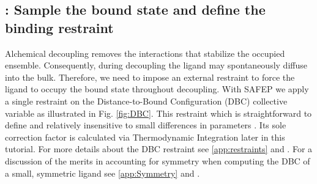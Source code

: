 \documentclass[9pt,tutorial]{Styling/livecoms}
\begin{document}
\renewcommand\thesubsection{Step \Alph{subsection}}
\subsection{\hspace{-1em}: Sample the bound state and define the binding restraint}\label{step:equilibrium}
    \begin{tcolorbox}[colback=blue!5!white,colframe=blue!75!black] 
    Alchemical decoupling removes the interactions that stabilize the occupied ensemble. 
    Consequently, during decoupling the ligand may spontaneously diffuse into the bulk. 
    Therefore, we need to impose an external restraint to force the ligand to occupy the bound state throughout decoupling. 
    With SAFEP we apply a single restraint on the Distance-to-Bound Configuration (DBC) collective variable as illustrated in Fig. \ref{fig:DBC}. 
    This restraint which is straightforward to define and relatively insensitive to small differences in parameters \cite{Salari2018}.
    Its sole correction factor is calculated via Thermodynamic Integration later in this tutorial. 
    For more details about the DBC restraint see \ref{app:restraints} and \cite{Salari2018}. 
    For a discussion of the merits in accounting for symmetry when computing the DBC of a small, symmetric ligand see \ref{app:Symmetry} and \cite{Ebrahimi2022}.
    \end{tcolorbox}
    
\end{document}
